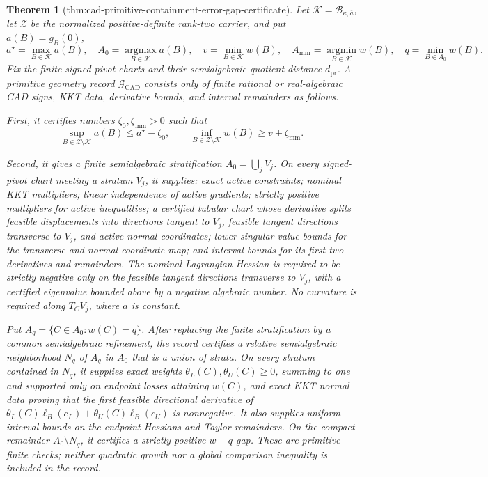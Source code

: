 \documentclass{article}
\newtheorem{theorem}{Theorem}
\begin{document}
\begin{theorem}[thm:cad-primitive-containment-error-gap-certificate]\label{thm:cad-primitive-containment-error-gap-certificate}
Let \(\mathcal K=\mathcal B_{\kappa,\overline a}\), let \(\mathcal Z\) be the normalized positive-definite rank-two carrier, and put \(a(B)=g_B(0)\),
\[
a^\star=\max_{B\in\mathcal K}a(B),
\quad A_0=\operatorname*{argmax}_{B\in\mathcal K}a(B),
\quad v=\min_{B\in\mathcal K}w(B),
\quad A_{\mathrm{mm}}=\operatorname*{argmin}_{B\in\mathcal K}w(B),
\quad q=\min_{B\in A_0}w(B).
\]
Fix the finite signed-pivot charts and their semialgebraic quotient distance \(d_{\mathrm{pr}}\).  A primitive geometry record \(\mathscr G_{\mathrm{CAD}}\) consists only of finite rational or real-algebraic CAD signs, KKT data, derivative bounds, and interval remainders as follows.

First, it certifies numbers \(\zeta_0,\zeta_{\mathrm{mm}}>0\) such that
\[
\sup_{B\in\mathcal Z\setminus\mathcal K}a(B)
\le a^\star-\zeta_0,
\qquad
\inf_{B\in\mathcal Z\setminus\mathcal K}w(B)
\ge v+\zeta_{\mathrm{mm}}.
\tag{G1}
\]

Second, it gives a finite semialgebraic stratification \(A_0=\bigcup_j V_j\).  On every signed-pivot chart meeting a stratum \(V_j\), it supplies: exact active constraints; nominal KKT multipliers; linear independence of active gradients; strictly positive multipliers for active inequalities; a certified tubular chart whose derivative splits feasible displacements into directions tangent to \(V_j\), feasible tangent directions transverse to \(V_j\), and active-normal coordinates; lower singular-value bounds for the transverse and normal coordinate map; and interval bounds for its first two derivatives and remainders.  The nominal Lagrangian Hessian is required to be strictly negative only on the feasible tangent directions transverse to \(V_j\), with a certified eigenvalue bounded above by a negative algebraic number.  No curvature is required along \(T_CV_j\), where \(a\) is constant.

Put \(A_q=\{C\in A_0:w(C)=q\}\).  After replacing the finite stratification by a common semialgebraic refinement, the record certifies a relative semialgebraic neighborhood \(N_q\) of \(A_q\) in \(A_0\) that is a union of strata.  On every stratum contained in \(N_q\), it supplies exact weights \(\theta_L(C),\theta_U(C)\ge0\), summing to one and supported only on endpoint losses attaining \(w(C)\), and exact KKT normal data proving that the first feasible directional derivative of \(\theta_L(C)\ell_B(c_L)+\theta_U(C)\ell_B(c_U)\) is nonnegative.  It also supplies uniform interval bounds on the endpoint Hessians and Taylor remainders.  On the compact remainder \(A_0\setminus N_q\), it certifies a strictly positive \(w-q\) gap.  These are primitive finite checks; neither quadratic growth nor a global comparison inequality is included in the record.


\end{theorem}
\end{document}
